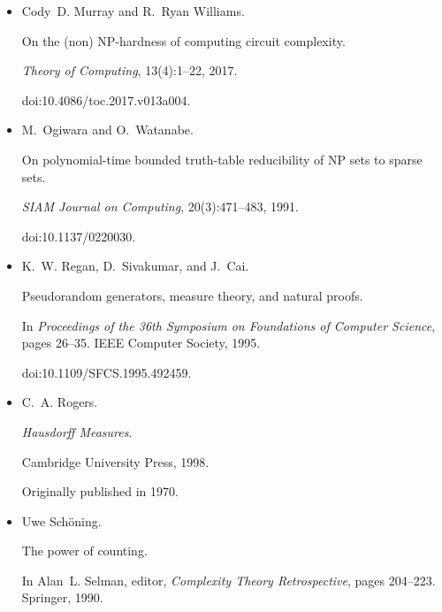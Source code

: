\begin{itemize}
doi:10.1007/3-540-48686-0\_21.





\item[] 
[65]

Cody D. Murray and R. Ryan Williams.


On the (non) NP-hardness of computing circuit complexity.


\emph{Theory of Computing}, 13(4):1–22, 2017.


doi:10.4086/toc.2017.v013a004.





\item[] 
[66]

M. Ogiwara and O. Watanabe.


On polynomial-time bounded truth-table reducibility of NP sets to
sparse sets.


\emph{SIAM Journal on Computing}, 20(3):471–483, 1991.


doi:10.1137/0220030.





\item[] 
[67]

K. W. Regan, D. Sivakumar, and J. Cai.


Pseudorandom generators, measure theory, and natural proofs.


In \emph{Proceedings of the 36th Symposium on Foundations of Computer
Science}, pages 26–35. IEEE Computer Society, 1995.


doi:10.1109/SFCS.1995.492459.





\item[] 
[68]

C. A. Rogers.


\emph{Hausdorff Measures}.


Cambridge University Press, 1998.


Originally published in 1970.





\item[] 
[69]

Uwe Schöning.


The power of counting.


In Alan L. Selman, editor, \emph{Complexity Theory Retrospective},
pages 204–223. Springer, 1990.



\end{itemize}
